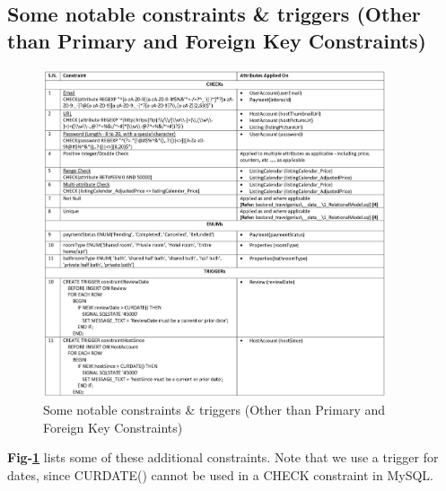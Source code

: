 \documentclass[conference]{IEEEtran}
\begin{document}
    \subsection{\textbf{Some notable constraints \& triggers (Other than Primary and Foreign Key Constraints)}}
        \begin{figure}[t]
            \centering
            \includegraphics[width=0.9\textwidth]{../Directly_As_Images/Constraints.JPG}
            \caption{Some notable constraints \& triggers (Other than Primary and Foreign Key Constraints) \cite{2_Email_Regular_Expression} \cite{3_Regular_Expression}} \label{fig_5}
        \end{figure}
        
        \textbf{Fig-\ref{fig_5}} lists some of these additional constraints. Note that we use a trigger for dates, since CURDATE() cannot be used in a CHECK constraint in MySQL.

        \vspace{1mm}
\end{document}

